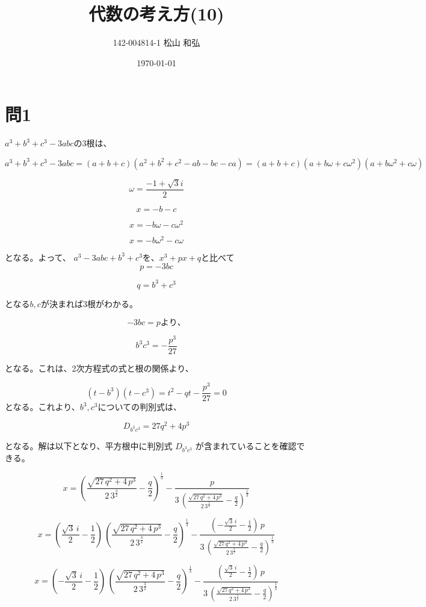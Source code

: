 \documentclass{jsarticle}
\title{代数の考え方(10)}
\author{142-004814-1 松山 和弘}
\date{\today}
\begin{document}
\maketitle

\section{問1}

$a^3+b^3+c^3-3abc$の3根は、

\[ a^3+b^3+c^3-3abc =
    (a+b+c)(a^2+b^2+c^2-ab-bc-ca) =
    (a+b+c)(a+b \omega +c \omega^2)(a+b\omega^2 + c\omega )
\]

\[ 
    \omega = \frac{-1 + \sqrt{3}i}{2}
\]


\[ 
    x=-b-c
\]

\[ 
    x=-b\omega-c\omega^2
\]

\[
    x=-b\omega^2-c\omega
\]

となる。よって、
$a^3-3abc+b^3+c^3$を、$x^3+px+q$と比べて
\[
    p=-3bc
\]

\[
    q=b^3+c^3
\]

となる$b,c$が決まれば3根がわかる。

\[
    -3bc=p より、
\]

\[
    b^3c^3=-\frac{p^3}{27}
\]

となる。これは、2次方程式の式と根の関係より、

\[
    (t-b^3)(t-c^3)=t^2-qt- \frac{p^3}{27}=0
\]
となる。これより、$b^3,c^3$についての判別式は、

\[
  D_{b^3c^3}=27q^2+4p^3
\]

となる。解は以下となり、平方根中に判別式  $D_{b^3c^3}$ が含まれていることを確認できる。

\[ x=\left(
 \frac{\sqrt{27\,q^2+4\,p^3}}{2\,3^{\frac{3}{2}}}-\frac{q}{2}\right)
 ^{\frac{1}{3}}-\frac{p}{3\,\left(\frac{\sqrt{27\,q^2+4\,p^3}}{2\,3^{
 \frac{3}{2}}}-\frac{q}{2}\right)^{\frac{1}{3}}} 
\]


\[ 
 x=\left(\frac{\sqrt{3}\,i}{2}- \frac{1}{2}\right)\,
 \left(\frac{\sqrt{27\,q^2+4\,p^3}}{2\,3^{\frac{3
 }{2}}}-\frac{q}{2}\right)^{\frac{1}{3}}-\frac{\left(-\frac{\sqrt{3}
 \,i}{2}-\frac{1}{2}\right)\,p}{3\,\left(\frac{\sqrt{27\,q^2+4\,p^3}
 }{2\,3^{\frac{3}{2}}}-\frac{q}{2}\right)^{\frac{1}{3}}}
\]


\[
 x=\left(-\frac{\sqrt{3}\,i}{2}-\frac{1}{2}\right)\,
 \left(
 \frac{\sqrt{27\,q^2+4\,p^3}}{2\,3^{\frac{3}{2}}}-\frac{q}{2}\right)
 ^{\frac{1}{3}}-\frac{\left(\frac{\sqrt{3}\,i}{2}-\frac{1}{2}\right)
 \,p}{3\,\left(\frac{\sqrt{27\,q^2+4\,p^3}}{2\,3^{\frac{3}{2}}}-
 \frac{q}{2}\right)^{\frac{1}{3}}}
\]
\end{document}
